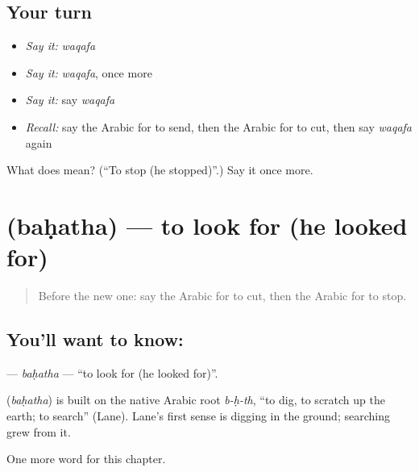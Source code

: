 \subsection*{Your turn}
\begin{itemize}
\raggedright
  \item \emph{Say it:} \emph{waqafa}
  \item \emph{Say it:} \emph{waqafa}, once more
  \item \emph{Say it:} say \emph{waqafa}
  \item \emph{Recall:} say the Arabic for to send, then the Arabic for to cut, then say \emph{waqafa} again
\end{itemize}

\begin{tcolorbox}[breakable,colback=teal!4,colframe=teal!35!black,title={Before you move on}]
What does  mean? (\textquotedblleft{}To stop (he stopped)\textquotedblright{}.) Say it once more.
\end{tcolorbox}
\section[\texorpdfstring{\ar{بحث} (baḥatha)}{بحث (baḥatha)}]{ (baḥatha) — to look for (he looked for)}

\label{lesson:AR-C62-bahatha}



\begin{quote}
Before the new one: say the Arabic for to cut, then the Arabic for to stop.
\end{quote}

\subsection*{You'll want to know: }
\textbf{} — \emph{baḥatha} — \textquotedblleft{}to look for (he looked for)\textquotedblright{}.

\begin{cousinweb}
\textbf{} (\emph{baḥatha}) is built on the native Arabic root \emph{b-ḥ-th}, \textquotedblleft{}to dig, to scratch up the earth; to search\textquotedblright{} (Lane). Lane's first sense is digging in the ground; searching grew from it.
\end{cousinweb}

\begin{grammarlens}[title={What you've built}]
One more word for this chapter.
\end{grammarlens}

